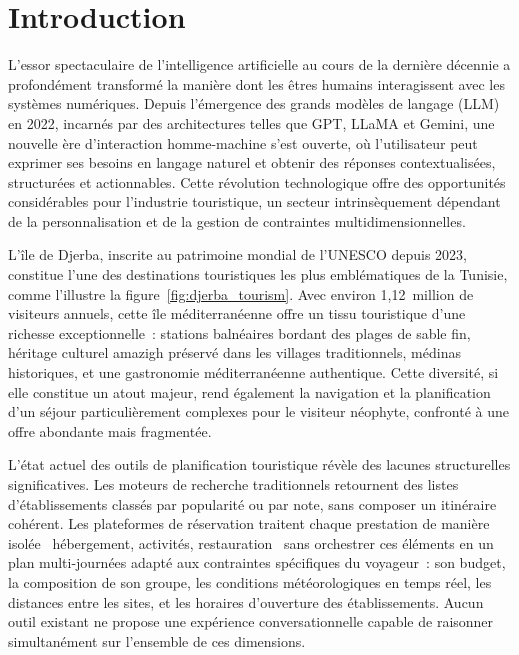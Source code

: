 
\section{Introduction}

L'essor spectaculaire de l'intelligence artificielle au cours de la dernière décennie a profondément
transformé la manière dont les êtres humains interagissent avec les systèmes numériques. Depuis
l'émergence des grands modèles de langage (LLM) en 2022, incarnés par des architectures telles que
GPT, LLaMA et Gemini, une nouvelle ère d'interaction homme-machine s'est ouverte, où l'utilisateur
peut exprimer ses besoins en langage naturel et obtenir des réponses contextualisées, structurées et
actionnables. Cette révolution technologique offre des opportunités considérables pour l'industrie
touristique, un secteur intrinsèquement dépendant de la personnalisation et de la gestion de
contraintes multidimensionnelles.

L'île de Djerba, inscrite au patrimoine mondial de l'UNESCO depuis 2023, constitue l'une des
destinations touristiques les plus emblématiques de la Tunisie, comme l'illustre la figure~\ref{fig:djerba_tourism}. Avec environ 1,12~million de
visiteurs annuels, cette île méditerranéenne offre un tissu touristique d'une richesse exceptionnelle~:
stations balnéaires bordant des plages de sable fin, héritage culturel amazigh préservé dans les
villages traditionnels, médinas historiques, et une gastronomie méditerranéenne authentique. 
Cette diversité, si elle constitue
un atout majeur, rend également la navigation et la planification d'un séjour particulièrement
complexes pour le visiteur néophyte, confronté à une offre abondante mais fragmentée.

L'état actuel des outils de planification touristique révèle des lacunes structurelles significatives.
Les moteurs de recherche traditionnels retournent des listes d'établissements classés par popularité
ou par note, sans composer un itinéraire cohérent. Les plateformes de réservation traitent chaque
prestation de manière isolée~  hébergement, activités, restauration~  sans orchestrer ces éléments
en un plan multi-journées adapté aux contraintes spécifiques du voyageur~: son budget, la composition
de son groupe, les conditions météorologiques en temps réel, les distances entre les sites, et les
horaires d'ouverture des établissements. Aucun outil existant ne propose une expérience
conversationnelle capable de raisonner simultanément sur l'ensemble de ces dimensions.

